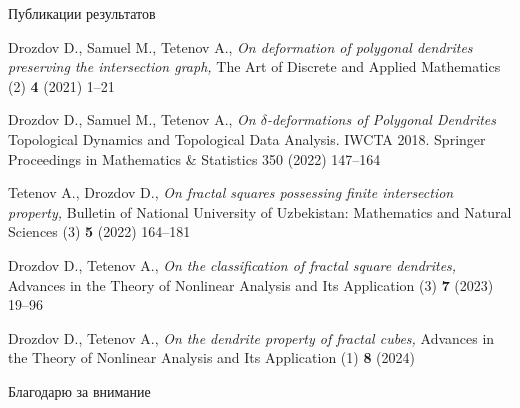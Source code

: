 \documentclass[aspectratio=1610, 10pt, notheorems]{beamer}
\begin{document}
%
%
%	
%
%
%	


\begin{frame}{Публикации результатов}
\begin{thebibliography}{9}
	{\sc Drozdov D., Samuel M., Tetenov A.,}
	{\em On deformation of polygonal dendrites preserving the intersection graph,}
	{The Art of Discrete and Applied Mathematics (2) \textbf{4} (2021) 1--21}
	
	{\sc Drozdov D., Samuel M., Tetenov A.,}
	{\em On $\delta$-deformations of Polygonal Dendrites}
	{Topological Dynamics and Topological Data Analysis. IWCTA 2018. Springer Proceedings in Mathematics \& Statistics 350 (2022)  147--164}
	
	{\sc Tetenov A., Drozdov D.,}
	{\em On fractal squares possessing finite intersection property,}
	{Bulletin of National University of Uzbekistan: Mathematics and Natural Sciences (3) \textbf{5} (2022) 164--181}
	
	{\sc Drozdov D., Tetenov A., }
	{\em On the classification of fractal square dendrites,}
	{Advances in the Theory of Nonlinear Analysis and Its Application (3) \textbf{7} (2023) 19--96}

	{\sc Drozdov D., Tetenov A., }
	{\em On the dendrite property of  fractal cubes,}
	{Advances in the Theory of Nonlinear Analysis and Its Application (1) \textbf{8} (2024)} 
	
\end{thebibliography}
\end{frame}


\begin{frame}{}
\begin{center}
\Huge Благодарю за внимание
\end{center}
\end{frame}
\end{document}
